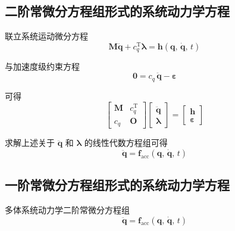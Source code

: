 \subsection{二阶常微分方程组形式的系统动力学方程}

联立系统运动微分方程
\begin{equation*}
\boldsymbol{M} \ddot{\boldsymbol{q}} + c_q^{\mathrm{T}} \boldsymbol{\lambda} = \boldsymbol{h}(\boldsymbol{q},\, \dot{\boldsymbol{q}},\, t)
\end{equation*}

与加速度级约束方程
\begin{equation*}
\boldsymbol{0} = c_q\, \ddot{\boldsymbol{q}} - \boldsymbol{\varepsilon}
\end{equation*}

可得
\begin{equation}\label{eq:3.combined_dae}
\begin{bmatrix} \boldsymbol{M} & c_q^{\mathrm{T}} \\[4pt] c_q & \boldsymbol{O} \end{bmatrix} \begin{bmatrix} \ddot{\boldsymbol{q}} \\[4pt] \boldsymbol{\lambda} \end{bmatrix} = \begin{bmatrix} \boldsymbol{h} \\[4pt] \boldsymbol{\varepsilon} \end{bmatrix}
\end{equation}

求解上述关于 $\ddot{\boldsymbol{q}}$ 和 $\boldsymbol{\lambda}$ 的线性代数方程组可得
\begin{equation}\label{eq:3.f_acc}
\ddot{\boldsymbol{q}} = \boldsymbol{f}_{\mathrm{acc}}(\boldsymbol{q},\, \dot{\boldsymbol{q}},\, t)
\end{equation}


\subsection{一阶常微分方程组形式的系统动力学方程}

多体系统动力学二阶常微分方程组
\begin{equation*}
\ddot{\boldsymbol{q}} = \boldsymbol{f}_{\mathrm{acc}}(\boldsymbol{q},\, \dot{\boldsymbol{q}},\, t)
\end{equation*}

